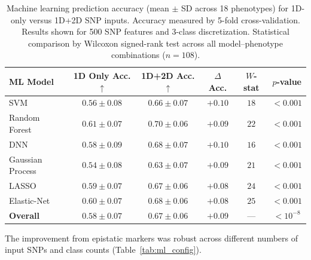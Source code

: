 \documentclass[11pt]{article}
\begin{document}
\begin{table}[H]
\centering
\caption{Machine learning prediction accuracy (mean $\pm$ SD across 18 phenotypes) for 1D-only versus 1D+2D SNP inputs. Accuracy measured by 5-fold cross-validation. Results shown for 500 SNP features and 3-class discretization. Statistical comparison by Wilcoxon signed-rank test across all model--phenotype combinations ($n = 108$).}
\label{tab:ml_results}
\begin{tabular}{lccccc}
\toprule
\textbf{ML Model} & \textbf{1D Only Acc.}$\uparrow$ & \textbf{1D+2D Acc.}$\uparrow$ & \textbf{$\Delta$ Acc.} & \textbf{$W$-stat} & \textbf{$p$-value} \\
\midrule
SVM \citep{cortes1995support} & $0.56 \pm 0.08$ & $0.66 \pm 0.07$ & $+0.10$ & $18$ & $< 0.001$ \\
Random Forest \citep{breiman2001random} & $0.61 \pm 0.07$ & $0.70 \pm 0.06$ & $+0.09$ & $22$ & $< 0.001$ \\
DNN \citep{lecun2015deep} & $0.58 \pm 0.09$ & $0.68 \pm 0.07$ & $+0.10$ & $16$ & $< 0.001$ \\
Gaussian Process \citep{rasmussen2006gaussian} & $0.54 \pm 0.08$ & $0.63 \pm 0.07$ & $+0.09$ & $21$ & $< 0.001$ \\
LASSO \citep{tibshirani1996regression} & $0.59 \pm 0.07$ & $0.67 \pm 0.06$ & $+0.08$ & $24$ & $< 0.001$ \\
Elastic-Net \citep{zou2005regularization} & $0.60 \pm 0.07$ & $0.68 \pm 0.06$ & $+0.08$ & $25$ & $< 0.001$ \\
\midrule
\textbf{Overall} & $\mathbf{0.58 \pm 0.07}$ & $\mathbf{0.67 \pm 0.06}$ & $\mathbf{+0.09}$ & --- & $< 10^{-8}$ \\
\bottomrule
\end{tabular}
\end{table}

The improvement from epistatic markers was robust across different numbers of input SNPs and class counts (Table~\ref{tab:ml_config}).
\end{document}
